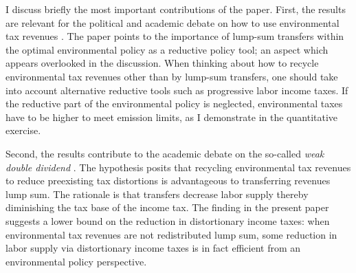 I discuss briefly the most important contributions of the paper.
First, the results are relevant for the political and academic debate on how  to use environmental tax revenues %
 \citep[e.g.][]{Baker2017TheDividends, Fried2018ClimateAnalysis, Carattini2018}. The paper points to the importance of lump-sum transfers within the optimal environmental policy as a reductive policy tool; an aspect which appears overlooked in the discussion. %
When thinking about how to recycle environmental tax revenues other than by lump-sum transfers,  one should take into account alternative reductive tools such as progressive labor income taxes. 
If the reductive part of the environmental policy is neglected, environmental taxes have to be higher to meet emission limits, as I demonstrate in the quantitative exercise.

Second, the results contribute to the academic debate on the so-called \textit{weak double dividend} \citep[for example:][]{LansBovenberg1994EnvironmentalTaxation, LansBovenberg1996OptimalAnalyses}. The hypothesis posits that recycling environmental tax revenues to reduce preexisting tax distortions is advantageous to transferring  revenues lump sum. The rationale is that transfers decrease labor supply thereby diminishing the tax base of the income tax. %
The finding in the present paper suggests a lower bound on the reduction in distortionary income taxes: when environmental tax revenues are not redistributed lump sum, some reduction in labor supply via distortionary income taxes is in fact efficient from an environmental policy perspective. %

